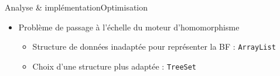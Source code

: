 \begin{frame}{Analyse \& implémentation}{Optimisation}
	\begin{itemize}
		\item Problème de passage à l'échelle du moteur d'homomorphisme
		\begin{itemize}
			\item Structure de données inadaptée pour représenter la BF : \texttt{ArrayList}
			\item	Choix d'une structure plus adaptée : \texttt{TreeSet}
		\end{itemize}
	\end{itemize}
\end{frame}

